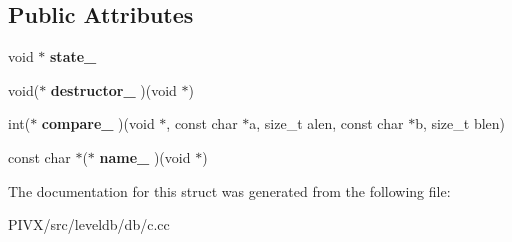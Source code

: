 \subsection*{Public Attributes}
\begin{DoxyCompactItemize}
\item 
\mbox{\label{structleveldb__comparator__t_a720da927befa8098f21437c663d0b0e2}} 
void $\ast$ {\bfseries state\+\_\+}
\item 
\mbox{\label{structleveldb__comparator__t_a757b51457e991ab2219fd5931426bb29}} 
void($\ast$ {\bfseries destructor\+\_\+} )(void $\ast$)
\item 
\mbox{\label{structleveldb__comparator__t_a55906beb72b9f3502c941c16c1187719}} 
int($\ast$ {\bfseries compare\+\_\+} )(void $\ast$, const char $\ast$a, size\+\_\+t alen, const char $\ast$b, size\+\_\+t blen)
\item 
\mbox{\label{structleveldb__comparator__t_a0ed64d60a3e077ed065d745fb6bdee15}} 
const char $\ast$($\ast$ {\bfseries name\+\_\+} )(void $\ast$)
\end{DoxyCompactItemize}


The documentation for this struct was generated from the following file\+:\begin{DoxyCompactItemize}
\item 
P\+I\+V\+X/src/leveldb/db/c.\+cc\end{DoxyCompactItemize}
